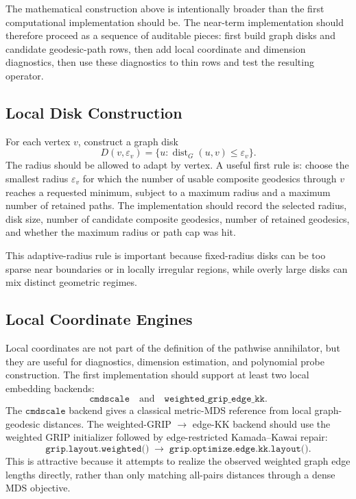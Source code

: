 \documentclass[11pt]{article}
\newcommand{\dist}{\operatorname{dist}}
\newcommand{\eps}{\varepsilon}
\begin{document}
The mathematical construction above is intentionally broader than the first
computational implementation should be.  The near-term implementation should
therefore proceed as a sequence of auditable pieces: first build graph disks
and candidate geodesic-path rows, then add local coordinate and dimension
diagnostics, then use these diagnostics to thin rows and test the resulting
operator.

\subsection{Local Disk Construction}

For each vertex \(v\), construct a graph disk
\[
  D(v,\eps_v)=\{u:\dist_G(u,v)\leq \eps_v\}.
\]
The radius should be allowed to adapt by vertex.  A useful first rule is:
choose the smallest radius \(\eps_v\) for which the number of usable composite
geodesics through \(v\) reaches a requested minimum, subject to a maximum
radius and a maximum number of retained paths.  The implementation should
record the selected radius, disk size, number of candidate composite geodesics,
number of retained geodesics, and whether the maximum radius or path cap was
hit.

This adaptive-radius rule is important because fixed-radius disks can be too
sparse near boundaries or in locally irregular regions, while overly large
disks can mix distinct geometric regimes.

\subsection{Local Coordinate Engines}

Local coordinates are not part of the definition of the pathwise annihilator,
but they are useful for diagnostics, dimension estimation, and polynomial
probe construction.  The first implementation should support at least two
local embedding backends:
\[
  \texttt{cmdscale}
  \quad\text{and}\quad
  \texttt{weighted\_grip\_edge\_kk}.
\]
The \(\texttt{cmdscale}\) backend gives a classical metric-MDS reference from
local graph-geodesic distances.  The weighted-GRIP \(\to\) edge-KK backend
should use the weighted GRIP initializer followed by edge-restricted
Kamada--Kawai repair:
\[
  \texttt{grip.layout.weighted()}
  \;\longrightarrow\;
  \texttt{grip.optimize.edge.kk.layout()}.
\]
This is attractive because it attempts to realize the observed weighted graph
edge lengths directly, rather than only matching all-pairs distances through a
dense MDS objective.
\end{document}
